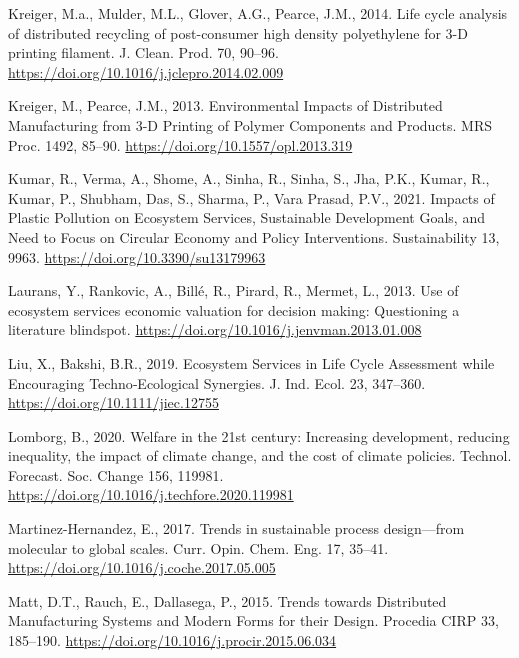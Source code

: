 \documentclass[]{elsarticle} %
\newlength{\cslhangindent}
\newenvironment{CSLReferences}[2] %
 {%
  \setlength{\parindent}{0pt}
  \ifodd #1 \everypar{\setlength{\hangindent}{\cslhangindent}}\ignorespaces\fi
  \ifnum #2 > 0
  \setlength{\parskip}{#2\baselineskip}
  \fi
 }%
 {}
\begin{document}
\begin{CSLReferences}{1}{0}
\leavevmode{}%
Kreiger, M.a., Mulder, M.L., Glover, A.G., Pearce, J.M., 2014. {Life cycle analysis of distributed recycling of post-consumer high density polyethylene for 3-D printing filament}. J. Clean. Prod. 70, 90--96. \url{https://doi.org/10.1016/j.jclepro.2014.02.009}

\leavevmode{}%
Kreiger, M., Pearce, J.M., 2013. {Environmental Impacts of Distributed Manufacturing from 3-D Printing of Polymer Components and Products}. MRS Proc. 1492, 85--90. \url{https://doi.org/10.1557/opl.2013.319}

\leavevmode{}%
Kumar, R., Verma, A., Shome, A., Sinha, R., Sinha, S., Jha, P.K., Kumar, R., Kumar, P., Shubham, Das, S., Sharma, P., Vara Prasad, P.V., 2021. {Impacts of Plastic Pollution on Ecosystem Services, Sustainable Development Goals, and Need to Focus on Circular Economy and Policy Interventions}. Sustainability 13, 9963. \url{https://doi.org/10.3390/su13179963}

\leavevmode{}%
Laurans, Y., Rankovic, A., Billé, R., Pirard, R., Mermet, L., 2013. {Use of ecosystem services economic valuation for decision making: Questioning a literature blindspot}. \url{https://doi.org/10.1016/j.jenvman.2013.01.008}

\leavevmode{}%
Liu, X., Bakshi, B.R., 2019. {Ecosystem Services in Life Cycle Assessment while Encouraging Techno‐Ecological Synergies}. J. Ind. Ecol. 23, 347--360. \url{https://doi.org/10.1111/jiec.12755}

\leavevmode{}%
Lomborg, B., 2020. {Welfare in the 21st century: Increasing development, reducing inequality, the impact of climate change, and the cost of climate policies}. Technol. Forecast. Soc. Change 156, 119981. \url{https://doi.org/10.1016/j.techfore.2020.119981}

\leavevmode{}%
Martinez-Hernandez, E., 2017. {Trends in sustainable process design---from molecular to global scales}. Curr. Opin. Chem. Eng. 17, 35--41. \url{https://doi.org/10.1016/j.coche.2017.05.005}

\leavevmode{}%
Matt, D.T., Rauch, E., Dallasega, P., 2015. {Trends towards Distributed Manufacturing Systems and Modern Forms for their Design}. Procedia CIRP 33, 185--190. \url{https://doi.org/10.1016/j.procir.2015.06.034}


\end{CSLReferences}
\end{document}
